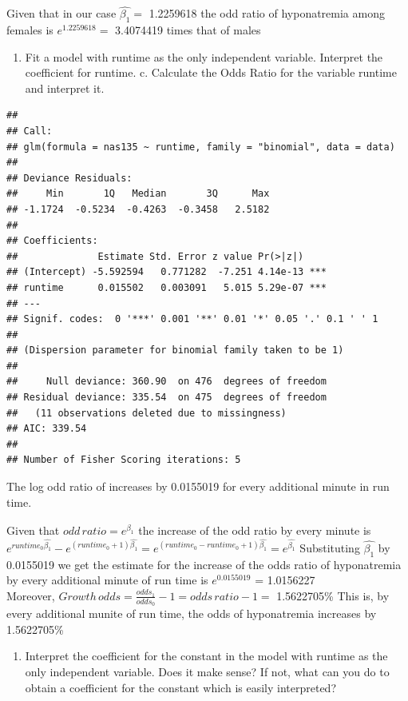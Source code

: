 \documentclass[]{article}
\begin{document}
Given that in our case $\hat{\beta_1}=$ 1.2259618 the odd ratio of
hyponatremia among females is $e^{1.2259618}=$ 3.4074419 times that of
males

\begin{enumerate}
\def\labelenumi{\alph{enumi}.}
\setcounter{enumi}{1}
\itemsep1pt\parskip0pt
\item
  Fit a model with runtime as the only independent variable. Interpret
  the coefficient for runtime. c. Calculate the Odds Ratio for the
  variable runtime and interpret it.
\end{enumerate}

\begin{verbatim}
## 
## Call:
## glm(formula = nas135 ~ runtime, family = "binomial", data = data)
## 
## Deviance Residuals: 
##     Min       1Q   Median       3Q      Max  
## -1.1724  -0.5234  -0.4263  -0.3458   2.5182  
## 
## Coefficients:
##              Estimate Std. Error z value Pr(>|z|)    
## (Intercept) -5.592594   0.771282  -7.251 4.14e-13 ***
## runtime      0.015502   0.003091   5.015 5.29e-07 ***
## ---
## Signif. codes:  0 '***' 0.001 '**' 0.01 '*' 0.05 '.' 0.1 ' ' 1
## 
## (Dispersion parameter for binomial family taken to be 1)
## 
##     Null deviance: 360.90  on 476  degrees of freedom
## Residual deviance: 335.54  on 475  degrees of freedom
##   (11 observations deleted due to missingness)
## AIC: 339.54
## 
## Number of Fisher Scoring iterations: 5
\end{verbatim}

The log odd ratio of increases by 0.0155019 for every additional minute
in run time.

Given that $odd\,ratio=e^{\hat{\beta_1}}$ the increase of the odd ratio
by every minute is
$e^{runtime_0\hat{\beta_1}}-e^{(runtime_0+1)\hat{\beta_1}}=e^{(runtime_0-runtime_0+1)\hat{\beta_1}}=e^{\hat{\beta_1}}$
Substituting $\hat{\beta_1}$ by 0.0155019 we get the estimate for the
increase of the odds ratio of hyponatremia by every additional minute of
run time is $e^{0.0155019}$ = 1.0156227\\Moreover,
$Growth\,odds=\frac{odds_1}{odds_0}-1=odds\,ratio-1=$ 1.5622705\% This
is, by every additional munite of run time, the odds of hyponatremia
increases by 1.5622705\%

\begin{enumerate}
\def\labelenumi{\alph{enumi}.}
\setcounter{enumi}{3}
\itemsep1pt\parskip0pt
\item
  Interpret the coefficient for the constant in the model with runtime
  as the only independent variable. Does it make sense? If not, what can
  you do to obtain a coefficient for the constant which is easily
  interpreted?
\end{enumerate}
\end{document}
